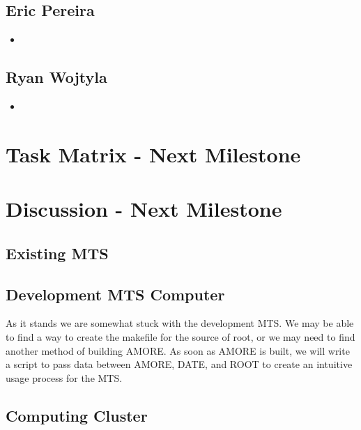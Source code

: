 \documentclass[12pt]{article}
\newcommand\tab[1][1cm]{\hspace*{#1}}
\begin{document}
\subsection{Eric Pereira}

\begin{itemize}
\item 
\end{itemize}

\subsection{Ryan Wojtyla}

\begin{itemize}
\item 
\end{itemize}

\section{Task Matrix - Next Milestone}

\begin{center}

\end{center}

\section{Discussion - Next Milestone}

\subsection{Existing MTS}

\tab 

\subsection{Development MTS Computer}
	As it stands we are somewhat stuck with the development MTS. We may be able to 
	find a way to create the makefile for the source of root, or we may need to 
	find another method of building AMORE. As soon as AMORE is built, we will write
	a script to pass data between AMORE, DATE, and ROOT to create an intuitive usage
	process for the MTS.
\tab 

\subsection{Computing Cluster}
\end{document}
